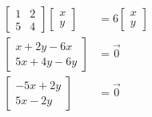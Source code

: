 \documentclass{article}
\begin{document}
\begin{align*}
        \begin{bmatrix}
        1 & 2 \\
        5 & 4  
        \end{bmatrix} 
        \left[ \begin{array}{c} 
        x \\
        y 
        \end{array} 
        \right]  &= 
        6\left[ \begin{array}{c} 
        x \\
        y 
        \end{array} \right] \\
        \left[ \begin{array}{c} 
        x + 2y -6x\\
        5x + 4y - 6y 
        \end{array} 
        \right] &= \vec{0} \\
        \left[ \begin{array}{c} 
        -5x + 2y\\
        5x - 2y 
        \end{array} 
        \right] &= \vec{0} \\

\end{align*}
\end{document}

